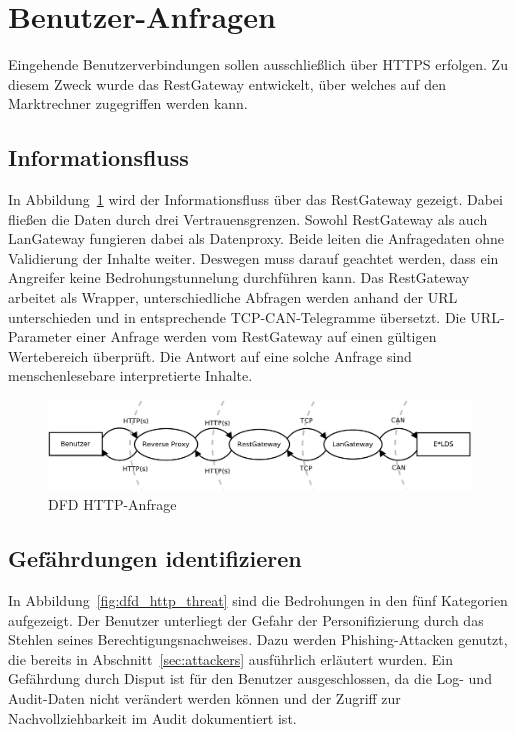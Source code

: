 \documentclass[11pt,a4paper]{report}
\begin{document}
\section{Benutzer-Anfragen} \label{sec:model_http}

Eingehende Benutzerverbindungen sollen ausschließlich über HTTPS erfolgen. Zu diesem Zweck wurde das RestGateway entwickelt, über welches auf den Marktrechner zugegriffen werden kann. 	

\subsection{Informationsfluss}

In Abbildung~\ref{fig:dfd_http} wird der Informationsfluss über das RestGateway gezeigt. Dabei fließen die Daten durch drei Vertrauensgrenzen. Sowohl RestGateway als auch LanGateway fungieren dabei als Datenproxy. Beide leiten die Anfragedaten ohne Validierung der Inhalte weiter. Deswegen muss darauf geachtet werden, dass ein Angreifer keine Bedrohungstunnelung durchführen kann. Das RestGateway arbeitet als Wrapper, unterschiedliche Abfragen werden anhand der URL unterschieden und in entsprechende TCP-CAN-Telegramme übersetzt. Die URL-Parameter einer Anfrage werden vom RestGateway auf einen gültigen Wertebereich überprüft. Die Antwort auf eine solche Anfrage sind menschenlesebare interpretierte Inhalte.

\begin{figure}[htbp]
\centering
\includegraphics[scale=0.3]{images/dfd_http.pdf}
\caption{DFD HTTP-Anfrage}
\label{fig:dfd_http}
\end{figure}

\subsection{Gefährdungen identifizieren}

In Abbildung~\ref{fig:dfd_http_threat} sind die Bedrohungen in den fünf Kategorien aufgezeigt. Der Benutzer unterliegt der Gefahr der Personifizierung durch das Stehlen seines Berechtigungsnachweises. Dazu werden Phishing-Attacken genutzt, die bereits in Abschnitt~\ref{sec:attackers} ausführlich erläutert wurden. Ein Gefährdung durch Disput ist für den Benutzer ausgeschlossen, da die Log- und Audit-Daten nicht verändert werden können und der Zugriff zur Nachvollziehbarkeit im Audit dokumentiert ist. 
\end{document}
